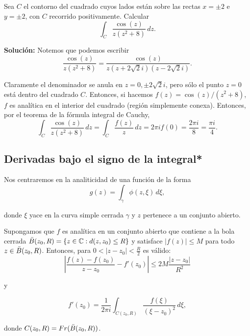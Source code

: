 \begin{ejemplo}
Sea $C$ el contorno del cuadrado cuyos lados están sobre las rectas $x = \pm 2$ e $y = \pm 2$, con $C$ recorrido positivamente. Calcular
$$\int_C \frac{\cos(z)}{z(z^2+8)} \,dz.$$

\textbf{Solución:} Notemos que podemos escribir 
$$\frac{\cos(z)}{z(z^2+8)} = \frac{\cos(z)}{z(z + 2\sqrt{2}i)(z- 2\sqrt{2}i)}.$$

Claramente el denominador se anula en $z = 0, \pm 2\sqrt{2}i$, pero sólo el punto $z = 0$ está dentro del cuadrado $C$. Entonces, si hacemos $f(z) =  \cos(z)/(z^2+8)$, $f$ es analítica en el interior del cuadrado (región simplemente conexa). Entonces, por el teorema de la fórmula integral de Cauchy,
$$\int_C \frac{\cos(z)}{z(z^2+8)} \,dz = \int_C \frac{f(z)}{z} \,dz = 2\pi i f(0) = \frac{2\pi i}{8} = \frac{\pi i}{4}.  $$
\end{ejemplo}

\subsection{Derivadas bajo el signo de la integral*}

Nos centraremos en la analiticidad de una función de la forma
$$g(z) = \int_{\gamma} \phi(z,\xi) \,d\xi,$$

donde $\xi$ yace en la curva simple cerrada $\gamma$ y $z$ pertenece a un conjunto abierto. 

\begin{lema} \label{LemaDerivadaIntegral}
Supongamos que $f$ es analítica en un conjunto abierto que contiene a la bola cerrada $\Bar{B}(z_0,R) = \{ z \in \mathbb{C}: d(z,z_0) \leq R\}$ y satisface $|f(z)| \leq M$ para todo $z \in \Bar{B}(z_0,R)$. Entonces, para $0 < |z-z_0| < \frac{R}{2}$ es válido:
\begin{equation}
\left| \frac{f(z) - f(z_0)}{z-z_0}  - f'(z_0)\right| \leq 2M \frac{|z-z_0|}{R^2}    \label{DerivadaIntegral1}
\end{equation}

y

\begin{equation}
   f'(z_0) = \frac{1}{2\pi i} \int_{C(z_0,R)} \frac{f(\xi)}{(\xi - z_0)^2} \,d\xi, \label{DerivadaIntegral2}
\end{equation}
    
donde $C(z_0,R) = Fr(\Bar{B}(z_0,R))$.
\end{lema}

